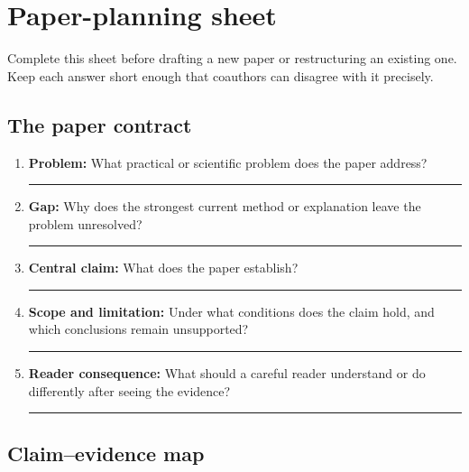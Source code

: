 \section{Paper-planning sheet}
\label{app:planning}

Complete this sheet before drafting a new paper or restructuring an existing
one. Keep each answer short enough that coauthors can disagree with it
precisely.

\subsection{The paper contract}

\begin{enumerate}[leftmargin=*]
    \item \textbf{Problem:} What practical or scientific problem does the paper
    address?

    \vspace{0.45cm}\hrule\vspace{0.35cm}

    \item \textbf{Gap:} Why does the strongest current method or explanation
    leave the problem unresolved?

    \vspace{0.45cm}\hrule\vspace{0.35cm}

    \item \textbf{Central claim:} What does the paper establish?

    \vspace{0.45cm}\hrule\vspace{0.35cm}

    \item \textbf{Scope and limitation:} Under what conditions does the claim
    hold, and which conclusions remain unsupported?

    \vspace{0.45cm}\hrule\vspace{0.35cm}

    \item \textbf{Reader consequence:} What should a careful reader understand
    or do differently after seeing the evidence?

    \vspace{0.45cm}\hrule
\end{enumerate}

\subsection{Claim--evidence map}

